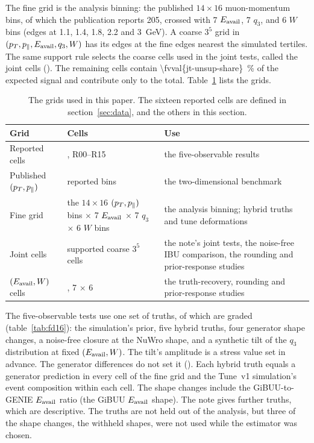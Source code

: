 The fine grid is the analysis binning: the published $14\times16$ muon-momentum bins, of which the publication reports 205, crossed with 7 $E_{\mathrm{avail}}$, 7 $q_{3}$, and 6 $W$ bins (edges at 1.1, 1.4, 1.8, 2.2 and \SI{3}{GeV}). A coarse $3^{5}$ grid in $(p_{T},p_{\parallel},E_{\mathrm{avail}},q_{3},W)$ has its edges at the fine edges nearest the simulated tertiles. The same support rule selects the \jtNcells{} coarse cells used in the joint tests, called the joint cells (). The remaining cells contain \SI{\fvval{jt-unsup-share}}{\percent} of the expected signal and contribute only to the total. Table~\ref{tab:grids} lists the grids.

\begin{table}[tb]
\centering
\caption{The grids used in this paper. The sixteen reported cells are defined in section~\ref{sec:data}, and the others in this section.}
\label{tab:grids}
\footnotesize\setlength{\tabcolsep}{3pt}
\begin{tabular}{@{}>{\raggedright\arraybackslash}p{2.0cm}>{\raggedright\arraybackslash}p{2.5cm}>{\raggedright\arraybackslash}p{3.6cm}@{}}
\toprule
Grid & Cells & Use \\
\midrule
Reported cells & 16, R00--R15 & the five-observable results \\
Published $(p_{T},p_{\parallel})$ & 205 reported bins & the two-dimensional benchmark \\
Fine grid & the $14\times16$ $(p_{T},p_{\parallel})$ bins $\times$ 7 $E_{\mathrm{avail}}$ $\times$ 7 $q_3$ $\times$ 6 $W$ bins & the analysis binning; hybrid truths and tune deformations \\
Joint cells & \jtNcells{} supported coarse $3^{5}$ cells & the note's joint tests, the noise-free IBU comparison, the rounding and prior-response studies \\
$(E_{\mathrm{avail}},W)$ cells & 42, 7 $\times$ 6 & the truth-recovery, rounding and prior-response studies \\
\bottomrule
\end{tabular}
\end{table}

The five-observable tests use one set of truths, of which  are graded (table~\ref{tab:fd16}): the simulation's prior, five hybrid truths, four generator shape changes, a noise-free closure at the NuWro shape, and a synthetic tilt of the $q_3$ distribution at fixed $(E_{\mathrm{avail}},W)$. The tilt's amplitude is a stress value set in advance. The generator differences do not set it (). Each hybrid truth equals a generator prediction in every cell of the fine grid and the Tune~v1 simulation's event composition within each cell. The shape changes include the GiBUU-to-GENIE $E_{\mathrm{avail}}$ ratio (the GiBUU $E_{\mathrm{avail}}$ shape). The note gives  further truths, which are descriptive. The truths are not held out of the analysis, but three of the shape changes, the withheld shapes, were not used while the estimator was chosen.


